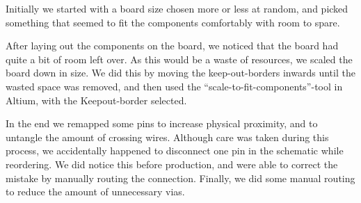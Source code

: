 Initially we started with a board size chosen more or less at random, and picked something that seemed to fit the components comfortably with room to spare.

After laying out the components on the board, we noticed that the board had quite a bit of room left over. As this would be a waste of resources, we scaled the board down in size. We did this by moving the keep-out-borders inwards until the wasted space was removed, and then used the ``scale-to-fit-components''-tool in Altium, with the Keepout-border selected.

In the end we remapped some pins to increase physical proximity, and to untangle the amount of crossing wires. Although care was taken during this process, we accidentally happened to disconnect one pin in the schematic while reordering. We did notice this before production, and were able to correct the mistake by manually routing the connection. Finally, we did some manual routing to reduce the amount of unnecessary vias.

